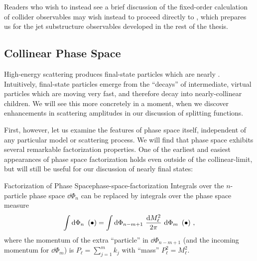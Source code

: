 Readers who wish to instead see a brief discussion of the fixed-order calculation of collider observables may wish instead to proceed directly to , which prepares us for the jet substructure observables developed in the rest of the thesis.


\subsection{Collinear Phase Space}
\label{sec:collinear-phase-space}


High-energy scattering produces final-state particles which are nearly .
%
Intuitively, final-state particles emerge from the ``decays'' of intermediate, virtual particles which are moving very fast, and therefore decay into nearly-collinear children.
%
We will see this more concretely in a moment, when we discover  enhancements in scattering amplitudes in our discussion of splitting functions.%

First, however, let us examine the  features of phase space itself, independent of any particular model or scattering process.
%
We will find that phase space exhibits several remarkable factorization properties.
%
One of the earliest and easiest appearances of phase space factorization holds even outside of the \gls{collinear-limit}, but will still be useful for our discussion of nearly  final states:

\begin{proposition}{Factorization of Phase Space}{phase-space-factorization}
    Integrals over the \(n\)-particle phase space \(\dd \Phi_n\) can be replaced by integrals over the  phase space measure
    \begin{align}
        \int \dd \Phi_n
        \,\,
        \left( \bullet \right)
        =
        \int \dd \Phi_{n-m+1}
        \,\,
        \frac{\dd M_\ell^2}{2\pi}
        \,\,
        \dd \Phi_m
        \,\,
        \left( \bullet \right)
        \,,
    \end{align}
    where the momentum of the extra ``particle'' in \(\dd \Phi_{n-m+1}\) (and the incoming momentum for \(\dd \Phi_m\)) is \(P_\ell = \sum_{j=1}^m k_j\) with ``mass'' \(P_\ell^2 = M_\ell^2\).
\end{proposition}

